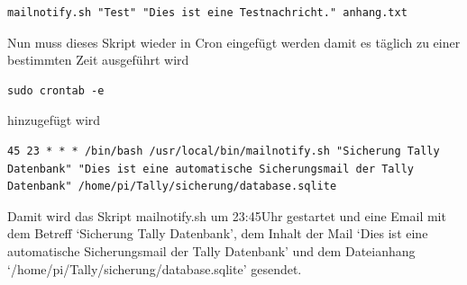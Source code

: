 \documentclass[11pt,a4paper]{article} %
\begin{document}
\begin{frame}

\begin{lstlisting}
mailnotify.sh "Test" "Dies ist eine Testnachricht." anhang.txt

\end{lstlisting}
\end{frame}
\par
Nun muss dieses Skript wieder in Cron eingefügt werden damit es täglich zu einer bestimmten Zeit ausgeführt wird
\begin{frame}

\begin{lstlisting}
sudo crontab -e

\end{lstlisting}
\end{frame}
hinzugefügt wird
\begin{frame}

\begin{lstlisting}
45 23 * * * /bin/bash /usr/local/bin/mailnotify.sh "Sicherung Tally Datenbank" "Dies ist eine automatische Sicherungsmail der Tally Datenbank" /home/pi/Tally/sicherung/database.sqlite

\end{lstlisting}
\end{frame}
Damit wird das Skript mailnotify.sh um 23:45Uhr gestartet und eine Email mit dem Betreff `Sicherung Tally Datenbank', dem Inhalt der Mail `Dies ist eine automatische Sicherungsmail der Tally Datenbank' und dem Dateianhang `/home/pi/Tally/sicherung/database.sqlite' gesendet.
\end{document}
